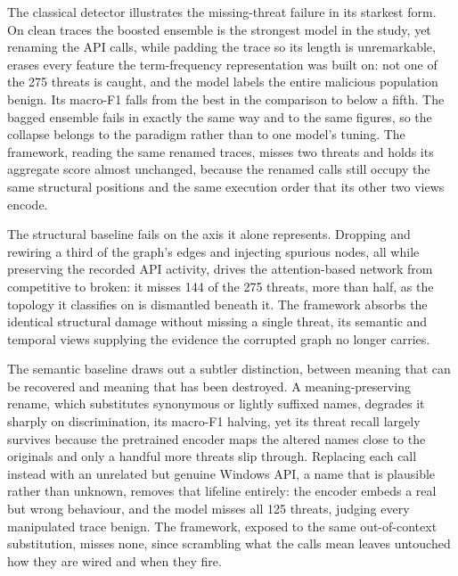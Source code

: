 \documentclass[%
    BCOR=10mm,
    DIV=13,
    toc=bibliography,
    toc=listof,
    oneside,
    12pt,
]{scrbook}
\begin{document}
The classical detector illustrates the missing-threat failure in its starkest
form. On clean traces the boosted ensemble is the strongest model in the study,
yet renaming the API calls, while padding the trace so its length is unremarkable,
erases every feature the term-frequency representation was built on: not one of
the 275 threats is caught, and the model labels the entire malicious population
benign. Its macro-F1 falls from the best in the comparison to below a fifth. The
bagged ensemble fails in exactly the same way and to the same figures, so the
collapse belongs to the paradigm rather than to one model's tuning. The
framework, reading the same renamed traces, misses two threats and holds its
aggregate score almost unchanged, because the renamed calls still occupy the same
structural positions and the same execution order that its other two views encode.

The structural baseline fails on the axis it alone represents. Dropping and
rewiring a third of the graph's edges and injecting spurious nodes, all while
preserving the recorded API activity, drives the attention-based network from
competitive to broken: it misses 144 of the 275 threats, more than half, as the
topology it classifies on is dismantled beneath it. The framework absorbs the
identical structural damage without missing a single threat, its semantic and
temporal views supplying the evidence the corrupted graph no longer carries.

The semantic baseline draws out a subtler distinction, between meaning that can be
recovered and meaning that has been destroyed. A meaning-preserving rename, which
substitutes synonymous or lightly suffixed names, degrades it sharply on
discrimination, its macro-F1 halving, yet its threat recall largely survives
because the pretrained encoder maps the altered names close to the originals and
only a handful more threats slip through. Replacing each call instead with an
unrelated but genuine Windows API, a name that is plausible rather than unknown,
removes that lifeline entirely: the encoder embeds a real but wrong behaviour, and
the model misses all 125 threats, judging every manipulated trace benign. The
framework, exposed to the same out-of-context substitution, misses none, since
scrambling what the calls mean leaves untouched how they are wired and when they
fire.
\end{document}
